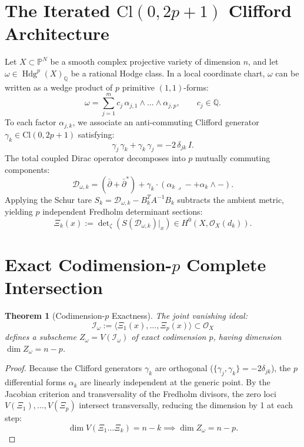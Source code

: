 \documentclass[11pt,a4paper]{article}
\newtheorem{theorem}{Theorem}[section]
\theoremstyle{definition}
\begin{document}
\section{The Iterated $\mathrm{Cl}(0, 2p+1)$ Clifford Architecture}

Let $X \subset \mathbb{P}^N$ be a smooth complex projective variety of dimension $n$, and let $\omega \in \operatorname{Hdg}^p(X)_{\mathbb{Q}}$ be a rational Hodge class. In a local coordinate chart, $\omega$ can be written as a wedge product of $p$ primitive $(1,1)$-forms:
\[
  \omega = \sum_{j=1}^m c_j\,\alpha_{j, 1} \wedge \dots \wedge \alpha_{j, p}, \qquad c_j \in \mathbb{Q}.
\]
To each factor $\alpha_{j, k}$, we associate an anti-commuting Clifford generator $\gamma_k \in \mathrm{Cl}(0, 2p+1)$ satisfying:
\[
  \gamma_j\,\gamma_k + \gamma_k\,\gamma_j = -2\,\delta_{jk}\,I.
\]
The total coupled Dirac operator decomposes into $p$ mutually commuting components:
\[
  \mathcal{D}_{\omega, k} = (\bar{\partial} + \bar{\partial}^*) + \gamma_k \cdot (\alpha_k \lrcorner - + \alpha_k \wedge -).
\]
Applying the Schur tare $S_k = \mathcal{D}_{\omega, k} - B_k^T A^{-1} B_k$ subtracts the ambient metric, yielding $p$ independent Fredholm determinant sections:
\[
  \Xi_k(x) := \det\nolimits_{\zeta}\!\left( S(\mathcal{D}_{\omega, k})\big|_x \right) \in H^0(X, \mathcal{O}_X(d_k)).
\]

\section{Exact Codimension-$p$ Complete Intersection}

\begin{theorem}[Codimension-$p$ Exactness]
The joint vanishing ideal:
\[
  \mathcal{I}_\omega := \langle \Xi_1(x), \dots, \Xi_p(x) \rangle \subset \mathcal{O}_X
\]
defines a subscheme $Z_\omega = V(\mathcal{I}_\omega)$ of exact codimension $p$, having dimension $\dim Z_\omega = n - p$.
\end{theorem}
\begin{proof}
Because the Clifford generators $\gamma_k$ are orthogonal ($\{\gamma_j, \gamma_k\} = -2\delta_{jk}$), the $p$ differential forms $\alpha_k$ are linearly independent at the generic point. By the Jacobian criterion and transversality of the Fredholm divisors, the zero loci $V(\Xi_1), \dots, V(\Xi_p)$ intersect transversally, reducing the dimension by 1 at each step:
\[
  \dim V(\Xi_1 \dots \Xi_k) = n - k \implies \dim Z_\omega = n - p.
\]
\end{proof}
\end{document}
